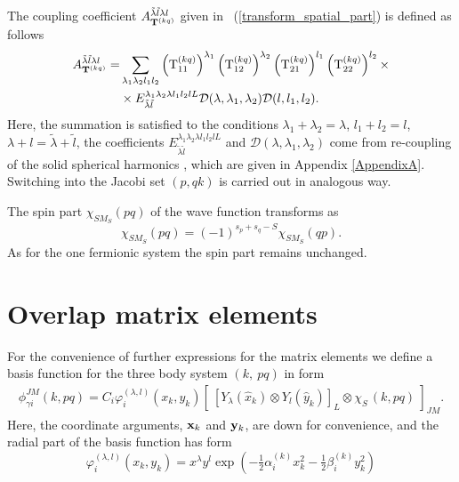 \documentclass[
12pt, %
oneside, %
english, %
doublespacing, %
doublespacing, %
toctotoc, %
parskip, %
headsepline, %
]{MastersDoctoralThesis} %
\begin{document}
The coupling coefficient $A^{\tilde{\lambda} \tilde{l} \lambda l}_{{\bf T}^{(kq)} }$  given in ~(\ref{transform_spatial_part}) is defined as follows
 \begin{align}
 A^{\tilde{\lambda} \tilde{l} \lambda l}_{{\bf T}^{(kq)} } = & \sum_{\lambda_1 \lambda_2 l_1 l_2} 
\left({\rm T}_{11}^{(kq)} \right)^{\lambda_1} 
\left({\rm T}_{12}^{(kq)} \right)^{\lambda_2} 
\left({\rm T}_{21}^{(kq)} \right)^{l_1} 
\left({\rm T}_{22}^{(kq)} \right)^{l_2} 
\times \nonumber
\\
& \times {E}^{\lambda_1 \lambda_2 \lambda l_1 l_2 l L}_{\tilde{\lambda} \tilde{l} } \mathcal{D}(\lambda,\lambda_1,\lambda_2) \mathcal{D}(l,l_1,l_2).    
\label{trans_coef}
\end{align}
Here, the summation is satisfied to the conditions $\lambda_1+\lambda_2=\lambda$, $l_1+l_2=l$, $\lambda+l=\tilde{\lambda}+\tilde{l}$, the coefficients ${E}^{\lambda_1 \lambda_2 \lambda l_1 l_2 l L}_{\tilde{\lambda} \tilde{l} }$ and $\mathcal{D}(\lambda,\lambda_1,\lambda_2)$ come from re-coupling of the solid spherical harmonics , which are given in Appendix \ref{AppendixA}. Switching into the Jacobi set $(p,qk)$ is carried out in analogous way.

The spin part $\chi_{SM_S}(pq)$ of the wave function transforms as
\begin{equation}
\chi_{SM_S}(pq) = (-1)^{s_p+s_q-S} \chi_{SM_S}(qp).
\end{equation}
As for the one fermionic system the spin part remains unchanged.

\section{Overlap matrix elements}
For the convenience of further expressions for the matrix elements we define a basis function for the three body system $(k,~pq)$ in form 
\begin{align}
\phi^{ J M}_{\gamma i} \left(k, pq \right)=
C_i
 \varphi^{(\lambda,l)}_i(x_k,y_k) \left[~ \left[ 
Y_\lambda \left(\hat{x}_k \right) \otimes Y_l \left(\hat{y}_k \right)\right]_{L} \otimes \chi_{S_{~}} (k,pq)~ \right]_{JM}.
\label{basis_function_1}
\end{align}
Here, the coordinate arguments, ${\bf x}_k$ and ${\bf y}_k$,   are down for convenience, and the radial part of the basis function has form
\begin{equation}
\varphi^{(\lambda,l)}_i(x_k,y_k)=
  x^\lambda y^l \exp\left( - \tfrac{1}{2} \alpha_i^{(k)} x^2_k - \tfrac{1}{2} \beta_i^{(k)} y^2_k \right)
\end{equation}
\end{document}
